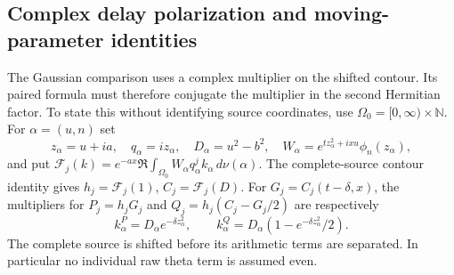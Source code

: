\documentclass[11pt]{article}
\numberwithin{equation}{section}
\theoremstyle{definition}
\theoremstyle{remark}
\begin{document}
\subsection{Complex delay polarization and moving-parameter identities}
\label{subsec:complex-delay-polarization}

The Gaussian comparison uses a complex multiplier on the shifted contour.
Its paired formula must therefore conjugate the multiplier in the second
Hermitian factor.  To state this without identifying source coordinates,
use $\Omega_0=[0,\infty)\times\mathbb N$.  For $\alpha=(u,n)$ set
\[
 z_\alpha=u+ia,\quad q_\alpha=iz_\alpha,\quad
 D_\alpha=u^2-b^2,\quad
 W_\alpha=e^{tz_\alpha^2+ixu}\phi_n(z_\alpha),
\]
and put
$\mathcal F_j(k)=e^{-ax}\Re\int_{\Omega_0}W_\alpha q_\alpha^j
k_\alpha\,d\nu(\alpha)$.  The complete-source contour identity gives
$h_j=\mathcal F_j(1)$, $C_j=\mathcal F_j(D)$.
For $G_j=C_j(t-\delta,x)$, the multipliers for $P_j=h_jG_j$ and
$Q_j=h_j(C_j-G_j/2)$ are respectively
\[
 k^P_\alpha=D_\alpha e^{-\delta z_\alpha^2},\qquad
 k^Q_\alpha=D_\alpha(1-e^{-\delta z_\alpha^2}/2).
\]
The complete source is shifted before its arithmetic terms are separated.
In particular no individual raw theta term is assumed even.
\end{document}

